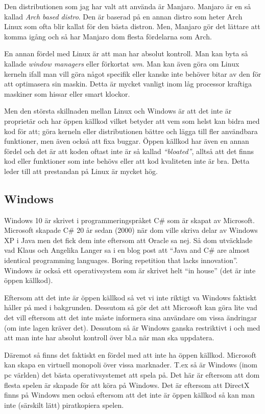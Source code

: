 \documentclass[12pt, a4paper]{report}
\begin{document}
  
   Den distributionen som jag har valt att använda är Manjaro\cite{manjaro}. Manjaro är en så kallad \textit{Arch based distro}. Den är baserad på en annan distro som heter Arch Linux som ofta blir kallat för den bästa distron. Men, Manjaro gör det lättare att komma igång och så har Manjaro dom flesta fördelarna som Arch.

   En annan fördel med Linux är att man har absolut kontroll. Man kan byta så kallade \textit{window managers} eller förkortat \textit{wm}\cite{wm}. Man kan även göra om Linux kerneln ifall man vill göra något specifik eller kanske inte behöver bitar av den för att optimasera sin maskin. Detta är mycket vanligt inom låg processor kraftiga maskiner som hissar eller smart klockor.

   Men den största skillnaden mellan Linux och Windows är att det inte är proprietär och har öppen källkod vilket betyder att vem som helst kan bidra med kod för att; göra kerneln eller distributionen bättre och lägga till fler användbara funktioner, men även också att fixa buggar. Öppen källkod har även en annan fördel och det är att koden oftast inte är så kallad \textit{``bloated''}, alltså att det finns kod eller funktioner som inte behövs eller att kod kvaliteten inte är bra. Detta leder till att prestandan på Linux är mycket hög.

   \subsection{Windows}
    
    Windows 10 är skrivet i programmeringspråket C\# som är skapat av Microsoft\cite{c}. Microsoft skapade C\# 20 år sedan (2000) när dom ville skriva delar av Windows XP i Java men det fick dem inte eftersom att Oracle sa nej. Så dom utväcklade vad Klaus och Angelika Langer sa i en blog post att ``Java and C\# are almost identical programming languages. Boring repetition that lacks innovation''.\cite{cquote} Windows är också ett operativsystem som är skrivet helt ``in house'' (det är inte öppen källkod). 
    
    Eftersom att det inte är öppen källkod så vet vi inte riktigt va Windows faktiskt håller på med i bakgrunden. Dessutom så gör det att Microsoft kan göra lite vad det vill eftersom att det inte måste informera sina användare om vissa ändringar (om inte lagen kräver det). Dessutom så är Windows ganska restriktivt i och med att man inte har absolut kontroll över bl.a när man ska uppdatera.
 
   Däremot så finns det faktiskt en fördel med att inte ha öppen källkod. Microsoft kan skapa en virtuell monopoli över vissa marknader. T.ex så är Windows (inom pc världen) det bästa operativsystemet att spela på. Det här är eftersom att dom flesta spelen är skapade för att köra på Windows. Det är eftersom att DirectX\cite{directx} finns på Windows men också eftersom att det inte är öppen källkod så kan man inte (särskilt lätt) piratkopiera spelen.
\end{document}
